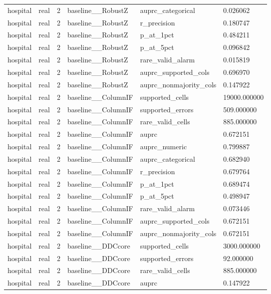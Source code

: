 \begin{tabular}{llllll}
hospital & real & 2 & baseline\_\_RobustZ & auprc\_categorical & 0.026062 \\
hospital & real & 2 & baseline\_\_RobustZ & r\_precision & 0.180747 \\
hospital & real & 2 & baseline\_\_RobustZ & p\_at\_1pct & 0.484211 \\
hospital & real & 2 & baseline\_\_RobustZ & p\_at\_5pct & 0.096842 \\
hospital & real & 2 & baseline\_\_RobustZ & rare\_valid\_alarm & 0.015819 \\
hospital & real & 2 & baseline\_\_RobustZ & auprc\_supported\_cols & 0.696970 \\
hospital & real & 2 & baseline\_\_RobustZ & auprc\_nonmajority\_cols & 0.147922 \\
hospital & real & 2 & baseline\_\_ColumnIF & supported\_cells & 19000.000000 \\
hospital & real & 2 & baseline\_\_ColumnIF & supported\_errors & 509.000000 \\
hospital & real & 2 & baseline\_\_ColumnIF & rare\_valid\_cells & 885.000000 \\
hospital & real & 2 & baseline\_\_ColumnIF & auprc & 0.672151 \\
hospital & real & 2 & baseline\_\_ColumnIF & auprc\_numeric & 0.799887 \\
hospital & real & 2 & baseline\_\_ColumnIF & auprc\_categorical & 0.682940 \\
hospital & real & 2 & baseline\_\_ColumnIF & r\_precision & 0.679764 \\
hospital & real & 2 & baseline\_\_ColumnIF & p\_at\_1pct & 0.689474 \\
hospital & real & 2 & baseline\_\_ColumnIF & p\_at\_5pct & 0.498947 \\
hospital & real & 2 & baseline\_\_ColumnIF & rare\_valid\_alarm & 0.073446 \\
hospital & real & 2 & baseline\_\_ColumnIF & auprc\_supported\_cols & 0.672151 \\
hospital & real & 2 & baseline\_\_ColumnIF & auprc\_nonmajority\_cols & 0.672151 \\
hospital & real & 2 & baseline\_\_DDCcore & supported\_cells & 3000.000000 \\
hospital & real & 2 & baseline\_\_DDCcore & supported\_errors & 92.000000 \\
hospital & real & 2 & baseline\_\_DDCcore & rare\_valid\_cells & 885.000000 \\
hospital & real & 2 & baseline\_\_DDCcore & auprc & 0.147922 \\

\end{tabular}
